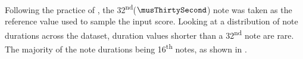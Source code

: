 
Following the practice of \textcite{micchi2020not}, the
32\textsuperscript{nd}($\musThirtySecond$) note was taken as
the reference value used to sample the input score. Looking
at a distribution of note durations across the dataset,
duration values shorter than a 32\textsuperscript{nd} note
are rare. The majority of the note durations being
16\textsuperscript{th} notes, as shown in
.

